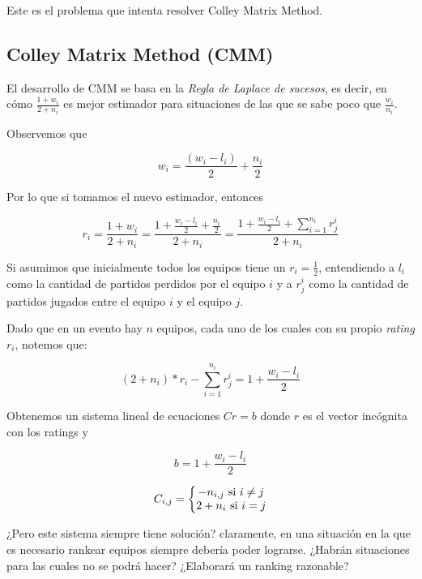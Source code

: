 Este es el problema que intenta resolver Colley Matrix Method.

\subsection{Colley Matrix Method (CMM)}

El desarrollo de CMM se basa en la \textit{Regla de Laplace de sucesos}, es decir, en cómo $\frac{1 + w_i}{2 + n_i}$ es mejor estimador para situaciones de las que se sabe poco que $\frac{w_i}{n_i}$.

Observemos que

\begin{equation}
    w_i = \frac{(w_i - l_i)}{2} + \frac{n_i}{2}
\end{equation}

Por lo que si tomamos el nuevo estimador, entonces

\begin{equation}
    r_i = \frac{1 + w_i}{2 + n_i} = \frac{1 + \frac{w_i - l_i}{2} + \frac{n_i}{2}}{2 + n_i} = \frac{1 + \frac{w_i - l_i}{2} + \sum_{i=1}^{n_i}{r_j^i}}{2 + n_i}
\end{equation}

Si asumimos que inicialmente todos los equipos tiene un $r_i = \frac{1}{2}$, entendiendo a $l_i$ como la cantidad de partidos perdidos por el equipo $i$ y a $r_j^i$ como la cantidad de partidos jugados entre el equipo $i$ y el equipo $j$.

Dado que en un evento hay $n$ equipos, cada uno de los cuales con su propio \textit{rating} $r_i$, notemos que:

\begin{equation}
    (2 + n_i) * r_i - \sum_{i = 1}^{n_i} r_j^i = 1 + \frac{w_i - l_i}{2}
\end{equation}

Obtenemos un sistema lineal de ecuaciones $C r = b$ donde $r$ es el vector incógnita con los ratings y

\begin{equation}
    b = 1 + \frac{w_i - l_i}{2}
\end{equation}

\begin{equation}
    C_{i, j} = \left\lbrace\begin{matrix} 
        -n_{i, j} $ si $ i\neq j\\
        2 + n_i $ si $ i = j\\
    \end{matrix}\right. 
\end{equation}

¿Pero este sistema siempre tiene solución? claramente, en una situación en la que es necesario rankear equipos siempre debería poder lograrse. ¿Habrán situaciones para las cuales no se podrá hacer? ¿Elaborará un ranking razonable?
